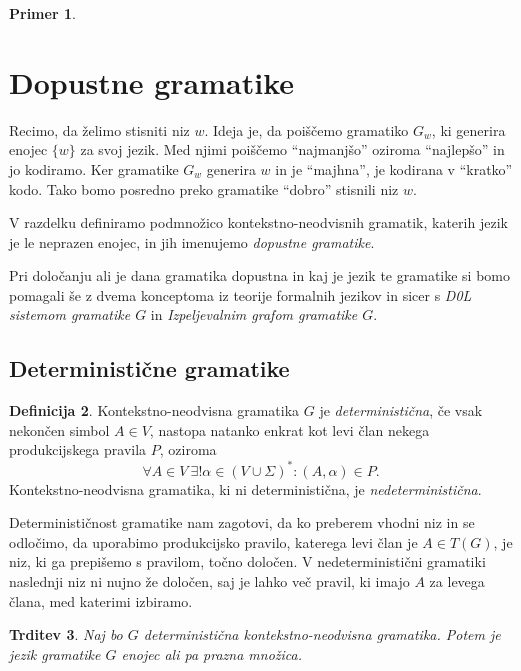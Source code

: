 \documentclass{amsart}
\theoremstyle{definition}
\newtheorem{definicija}{Definicija}[section]
\newtheorem{primer}[definicija]{Primer}
\theoremstyle{plain} %
\newtheorem{trditev}[definicija]{Trditev}
\begin{document}
\begin{primer}
    
\end{primer}

\section{Dopustne gramatike}

Recimo, da želimo stisniti niz $ w $. Ideja je, da poiščemo gramatiko $ G_w $, ki generira
enojec $ \{ w \} $ za svoj jezik. Med njimi poiščemo ``najmanjšo'' oziroma ``najlepšo'' in jo kodiramo.
Ker gramatike $ G_w $ generira $ w $ in je ``majhna'', je kodirana v ``kratko'' kodo.
Tako bomo posredno preko gramatike ``dobro'' stisnili niz $ w $.

V razdelku definiramo podmnožico kontekstno-neodvisnih gramatik, katerih jezik je le
neprazen enojec, in jih imenujemo \textit{dopustne gramatike}.

Pri določanju ali je dana gramatika dopustna in kaj je jezik te gramatike si bomo pomagali še z dvema konceptoma iz
teorije formalnih jezikov in sicer s \textit{D0L sistemom gramatike $G$} in \textit{Izpeljevalnim grafom gramatike $G$}.


\subsection*{Deterministične gramatike}

\begin{definicija}
    
    Kontekstno-neodvisna gramatika $G$ je \textit{deterministična}, če vsak nekončen simbol $ A \in V $,
    nastopa natanko enkrat kot levi član nekega produkcijskega pravila $ P $, oziroma
    \[
        \forall A \in V \ \exists! \alpha \in ( V \cup \Sigma )^*  \colon (A,\alpha) \in P.
    \]
    Kontekstno-neodvisna gramatika, ki ni deterministična, je \textit{nedeterministična}.

\end{definicija}

Determinističnost gramatike nam zagotovi, da ko preberem vhodni niz in se odločimo, da uporabimo produkcijsko 
pravilo, katerega levi član je $ A \in T(G) $, je niz, ki ga prepišemo s pravilom, točno določen.
V nedeterministični gramatiki naslednji niz ni nujno že določen, saj je lahko več pravil, ki imajo $ A $ za levega člana, med 
katerimi izbiramo.

\begin{trditev}

    Naj bo $G$ deterministična kontekstno-neodvisna gramatika. Potem je jezik gramatike $G$ enojec ali pa prazna množica.

\end{trditev}
\end{document}
